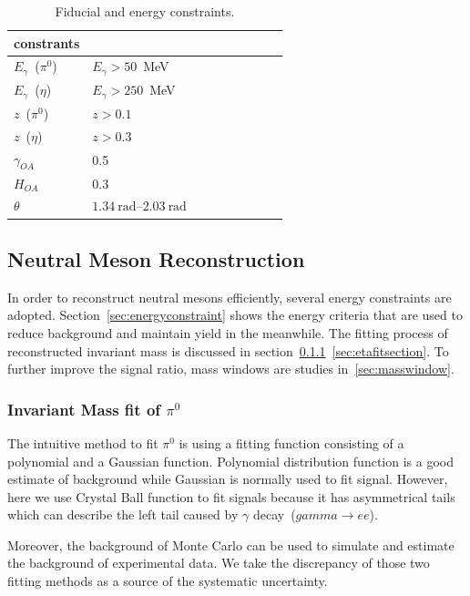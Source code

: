 \begin{table}[H]\small
\centering
\begin{tabular}{|l|l|l|l|l|l|l|l|l|}
\hline
constrants &   \\ \hline
$E_\gamma$~($\pi^0$) & $E_\gamma >50$~MeV \\ \hline
$E_\gamma$~($\eta$) & $E_\gamma >250$~MeV \\ \hline
$z$~($\pi^0$) & $z>0.1$ \\ \hline
$z$~($\eta$) & $z>0.3$ \\ \hline
$\gamma_{OA}$ & 0.5 \\ \hline
$H_{OA}$ & 0.3 \\ \hline
$\theta$ &  $1.34~\text{rad}$\textup{--}$ 2.03~\text{rad}$ \\ \hline
\end{tabular}
\caption{Fiducial and energy constraints.}
\label{tab:constrain}
\end{table}

\subsection{Neutral Meson Reconstruction}
\label{sec:neutralmesonreconstruction}
In order to reconstruct neutral mesons efficiently, several energy constraints are adopted. Section~\ref{sec:energyconstraint} shows the energy criteria that are used to reduce background and maintain yield in the meanwhile. The fitting process of reconstructed invariant mass is discussed in section~\ref{sec:pi0fitsection}~\ref{sec:etafitsection}. To further improve the signal ratio, mass windows are studies in~\ref{sec:masswindow}.

\subsubsection{\texorpdfstring{Invariant Mass fit of $\pi^0$}{pi0 fit}}
\label{sec:pi0fitsection}
The intuitive method to fit $\pi^0$ is using a fitting function consisting of a polynomial and a Gaussian function. Polynomial distribution function is a good estimate of background while Gaussian is normally used to fit signal. However, here we use Crystal Ball function to fit signals because it has asymmetrical tails which can describe the left tail caused by $\gamma$ decay~($gamma\rightarrow ee$).

Moreover, the background of Monte Carlo can be used to simulate and estimate the background of experimental data. We take the discrepancy of those two fitting methods as a source of the systematic uncertainty.
